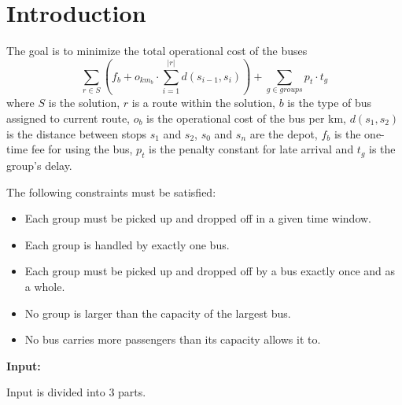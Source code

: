 \chapter*{Introduction}




The goal is to minimize the total operational cost of the buses
\begin{equation}\label{eq:fitness}
    \sum_{r \in S} ( f_b + o_{km_b} \cdot \sum_{i=1}^{|r|}d(s_{i-1},s_{i})) + \sum_{g \in groups} p_t \cdot t_g
\end{equation}
where $S$ is the solution, $r$ is a route within the solution, $b$ is the type of bus assigned to current route, $o_b$ is the operational cost of the bus per km, $d(s_1, s_2)$ is the distance between stops $s_1$ and $s_2$, $s_0$ and $s_n$ are the depot, $f_b$ is the one-time fee for using the bus, $p_t$ is the penalty constant for late arrival and $t_g$ is the group's delay.

The following constraints must be satisfied:
\begin{itemize}
    \item Each group must be picked up and dropped off in a given time window.
    \item Each group is handled by exactly one bus.
    \item Each group must be picked up and dropped off by a bus exactly once and as a whole.
    \item No group is larger than the capacity of the largest bus.
    \item No bus carries more passengers than its capacity allows it to.
\end{itemize}


\textbf{Input:}

Input is divided into 3 parts.

